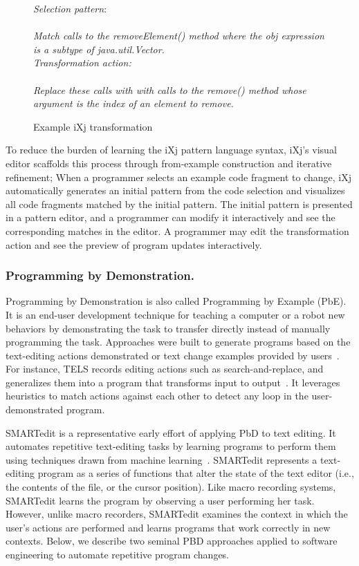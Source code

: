 \begin{figure} 
{\it Selection pattern}: \\
 \\
\it{Match calls to the {removeElement()} method where the {obj} expression is a subtype of {java.util.Vector}.} \\
{\it Transformation action}:\\
 \\
\it{Replace these calls with with calls to the {remove()} method whose argument is the index of an element to remove.} 
\caption{Example iXj transformation} 
\label{ixj_example} 
\end{figure} 


To reduce the burden of learning the iXj pattern language syntax, iXj's visual editor scaffolds this process through from-example construction and iterative refinement; When a programmer selects an example code fragment to change, iXj automatically generates an initial pattern from the code selection and visualizes all code fragments matched by the initial pattern. The initial pattern is presented in a pattern editor, and a programmer can modify it interactively and see the corresponding matches in the editor. A programmer may edit the transformation action and see the preview of program updates interactively. 

\subsubsection{Programming by Demonstration.} 
Programming by Demonstration is also called Programming by Example (PbE). It is an end-user development technique for teaching a computer or a robot new behaviors by demonstrating the task to transfer directly instead of manually programming the task.  Approaches were built to generate programs based on the text-editing actions demonstrated or text change examples provided by users~\cite{Nix1984,wiki:bsd-comparison,LaH1995,LWD2001}. For instance, TELS records editing actions such as search-and-replace, and generalizes them into a program that transforms input to output~\cite{wiki:bsd-comparison}. It leverages heuristics to match actions against each other to detect any loop in the user-demonstrated program. 

SMARTedit is a representative early effort of applying PbD to text editing. It automates repetitive text-editing tasks by learning programs to perform them using techniques drawn from machine learning~\cite{LWD2001}. SMARTedit represents a text-editing program as a series of functions that alter the state of the text editor (i.e., the contents of the file, or the cursor position). Like macro recording systems, SMARTedit learns the program by observing a user performing her task. However, unlike macro recorders, SMARTedit examines the context in which the user's actions are performed and learns programs that work correctly in new contexts. Below, we describe two seminal PBD approaches applied to software engineering to automate repetitive program changes. 

